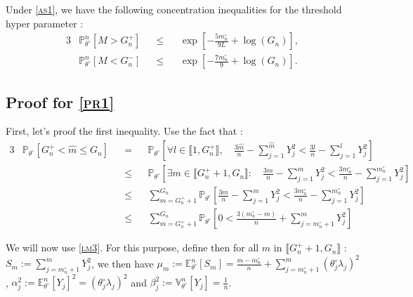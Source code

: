 \begin{pr}\label{pr1}
Under \textsc{\cref{as1}}, we have the following concentration inequalities for the threshold hyper parameter :
\begin{alignat*}{3}
& \mathds{P}_{\theta^{\circ}}^{n}\left[M > G_{n}^{+}\right] &&\leq&& \exp\left[- \frac{5 m_{n}^{\circ}}{9 L} + \log \left(G_{n}\right)\right],\\
& \mathds{P}_{\theta^{\circ}}^{n}\left[M < G_{n}^{-}\right] &&\leq&& \exp\left[- \frac{7 m_{n}^{\circ}}{9} + \log \left(G_{n}\right)\right].
\end{alignat*}
\end{pr}

\subsection{Proof for \textsc{\cref{pr1}}}

First, let's proof the first inequality.
Use the fact that : 
\begin{alignat*}{3}
& \mathds{P}_{\theta^{\circ}}\left[G_{n}^{+} < \widehat{m} \leq G_{n}\right]
&&=&& \mathds{P}_{\theta^{\circ}} \left[\forall l \in \llbracket 1, G_{n}^{+}\rrbracket, \quad \frac{3 \widehat{m}}{n} - \sum\limits_{j=1}^{\widehat{m}} Y_{j}^{2} < \frac{3 l}{n} - \sum\limits_{j=1}^{l} Y_{j}^{2} \right]\\
& &&\leq&& \mathds{P}_{\theta^{\circ}}\left[\exists m \in \llbracket G_{n}^{+} + 1, G_{n}\rrbracket : \quad \frac{3 m}{n} - \sum\limits_{j=1}^{m} Y_{j}^{2} < \frac{3 m_{n}^{\circ}}{n} - \sum\limits_{j=1}^{m_{n}^{\circ}} Y_{j}^{2} \right]\\
& &&\leq&& \sum\limits_{m = G_{n}^{+} + 1}^{G_{n}} \mathds{P}_{\theta^{\circ}}\left[\frac{3 m}{n} - \sum\limits_{j=1}^{m} Y_{j}^{2} < \frac{3 m_{n}^{\circ}}{n} - \sum\limits_{j=1}^{m_{n}^{\circ}} Y_{j}^{2}\right]\\
& &&\leq&& \sum\limits_{m = G_{n}^{+} + 1}^{G_{n}} \mathds{P}_{\theta^{\circ}}\left[0 < \frac{3 \left(m_{n}^{\circ} - m \right)}{n} + \sum\limits_{j = m_{n}^{\circ} + 1}^{m} Y_{j}^{2}\right]
\end{alignat*}

We will now use \textsc{\cref{lm3}}. For this purpose, define then for all $m$ in $\llbracket G_{n}^{+} + 1, G_{n} \rrbracket$ : $S_{m} := \sum\limits_{j = m_{n}^{\circ} + 1}^{m} Y_{j}^{2}$, we then have $\mu_{m} := \mathds{E}_{\theta^{\circ}}^{n}\left[S_{m}\right] = \frac{m- m_{n}^{\circ}}{n} + \sum\limits_{j = m_{n}^{\circ} + 1}^{m} \left(\theta^{\circ}_{j}\lambda_{j}\right)^{2}$, $\alpha_{j}^{2} := \mathds{E}_{\theta^{\circ}}^{n}\left[Y_{j}\right]^{2} =  \left(\theta^{\circ}_{j}\lambda_{j}\right)^{2}$ and $\beta_{j}^{2} := \mathds{V}_{\theta^{\circ}}^{n}\left[Y_{j}\right] = \frac{1}{n}$.

